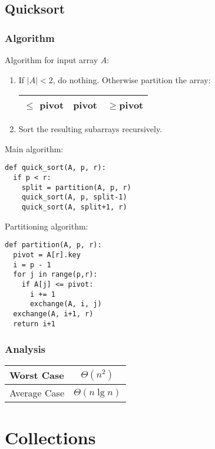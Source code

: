 \documentclass{article}
\begin{document}
\subsection{Quicksort}


\subsubsection{Algorithm}

Algorithm for input array $A$:
\begin{enumerate}
	\item If $|A|<2$, do nothing. Otherwise partition the array:
	\begin{tabular}{|c|c|c|}
		\hline
		$\leq$ pivot & pivot & $\geq$pivot\\
		\hline
	\end{tabular}
	\item Sort the resulting subarrays recursively.
\end{enumerate}

\noindent Main algorithm:
\begin{verbatim}
def quick_sort(A, p, r):
  if p < r:
    split = partition(A, p, r)
	quick_sort(A, p, split-1)
	quick_sort(A, split+1, r)
\end{verbatim}

\noindent Partitioning algorithm:
\begin{verbatim}
def partition(A, p, r):
  pivot = A[r].key
  i = p - 1
  for j in range(p,r):
    if A[j] <= pivot:
      i += 1
      exchange(A, i, j)
  exchange(A, i+1, r)
  return i+1
\end{verbatim}

\subsubsection{Analysis}

\begin{center}
	\begin{tabular}{| l | c |}
		\hline
		Worst Case & $\Theta(n^2)$\\
		\hline
		Average Case & $\Theta(n\lg n)$\\
		\hline
	\end{tabular}
	\end{center}


\section{Collections}
\end{document}
